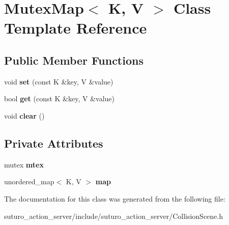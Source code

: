 \hypertarget{classMutexMap}{\section{Mutex\-Map$<$ K, V $>$ Class Template Reference}
\label{classMutexMap}
}
\subsection*{Public Member Functions}
\begin{DoxyCompactItemize}
\item 
\hypertarget{classMutexMap_a8a3c932f1158bf476446dd65e789ee0d}{void {\bfseries set} (const K \&key, V \&value)}\label{classMutexMap_a8a3c932f1158bf476446dd65e789ee0d}

\item 
\hypertarget{classMutexMap_a5113371874f6df8db201c5b40365e2ac}{bool {\bfseries get} (const K \&key, V \&value)}\label{classMutexMap_a5113371874f6df8db201c5b40365e2ac}

\item 
\hypertarget{classMutexMap_aa47c8dfe143b551c93bd8ea61ce27627}{void {\bfseries clear} ()}\label{classMutexMap_aa47c8dfe143b551c93bd8ea61ce27627}

\end{DoxyCompactItemize}
\subsection*{Private Attributes}
\begin{DoxyCompactItemize}
\item 
\hypertarget{classMutexMap_a75dda3d7c21b3cb689c331b5bbaad117}{mutex {\bfseries mtex}}\label{classMutexMap_a75dda3d7c21b3cb689c331b5bbaad117}

\item 
\hypertarget{classMutexMap_a3c9466093fa30dc59e55e4eb1c34c42f}{unordered\-\_\-map$<$ K, V $>$ {\bfseries map}}\label{classMutexMap_a3c9466093fa30dc59e55e4eb1c34c42f}

\end{DoxyCompactItemize}


The documentation for this class was generated from the following file\-:\begin{DoxyCompactItemize}
\item 
suturo\-\_\-action\-\_\-server/include/suturo\-\_\-action\-\_\-server/Collision\-Scene.\-h\end{DoxyCompactItemize}
